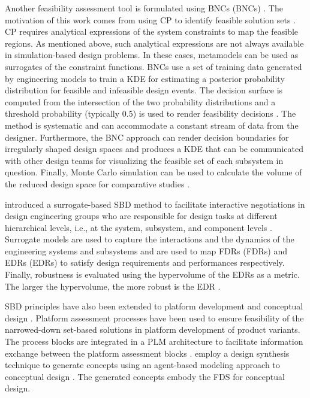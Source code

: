 Another feasibility assessment tool is formulated using \aclp{BNC} (\acsp{BNC}) \cite{Shahan2012,Backlund2015,Rosen2015a}. The motivation of this work comes from using \ac{CP} to identify feasible solution sets \cite{Yannou2003}. \Ac{CP} requires analytical expressions of the system constraints to map the feasible regions. As mentioned above, such analytical expressions are not always available in simulation-based design problems. In these cases, metamodels can be used as surrogates of the constraint functions. \acp{BNC} use a set of training data generated by engineering models to train a \ac{KDE} for estimating a posterior probability distribution for feasible and infeasible design events. The decision surface is computed from the intersection of the two probability distributions and a threshold probability (typically 0.5) is used to render feasibility decisions \cite{Shahan2012}. The method is systematic and can accommodate a constant stream of data from the designer. Furthermore, the \ac{BNC} approach can render decision boundaries for irregularly shaped design spaces and produces a \ac{KDE} that can be communicated with other design teams for visualizing the feasible set of each subsystem in question. Finally, Monte Carlo simulation can be used to calculate the volume of the reduced design space for comparative studies \cite{Yannou2003}.

\citeauthor{Ge2005} introduced a surrogate-based \ac{SBD} method to facilitate interactive negotiations in design engineering groups who are responsible for design tasks at different hierarchical levels, i.e., at the system, subsystem, and component levels \cite{Ge2005}. Surrogate models are used to capture the interactions and the dynamics of the engineering systems and subsystems and are used to map \aclp{FDR} (\acsp{FDR}) and \aclp{EDR} (\acsp{EDR}) to satisfy design requirements and performances respectively. Finally, robustness is evaluated using the hypervolume of the \acp{EDR} as a metric. The larger the hypervolume, the more robust is the \ac{EDR} \cite{Taguchi1987}.

\ac{SBD} principles have also been extended to platform development \cite{Landahl2016,Suh2007} and conceptual design \cite{Jiachuan2003}. Platform assessment processes have been used to ensure feasibility of the narrowed-down set-based solutions in platform development of product variants. The process blocks are integrated in a \ac{PLM} architecture to facilitate information exchange between the platform assessment blocks \cite{Landahl2016}. \citeauthor{Jiachuan2003} employ a design synthesis technique to generate concepts using an agent-based modeling approach to conceptual design \cite{Jiachuan2003}. The generated concepts embody the \ac{FDS} for conceptual design.

